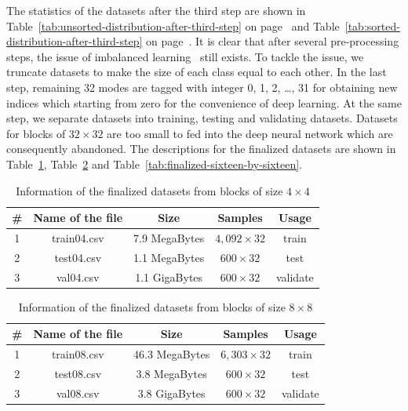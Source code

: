 The statistics of the datasets after the third step are
shown in Table~\ref{tab:unsorted-distribution-after-third-step}
on page~\pageref{tab:unsorted-distribution-after-third-step} and 
Table~\ref{tab:sorted-distribution-after-third-step}
on page~\pageref{tab:sorted-distribution-after-third-step}.
It is clear that after several pre-processing steps,
the issue of imbalanced learning~\parencite{RN215}
still exists.
To tackle the issue, we truncate datasets to make the
size of each class equal to each other.
In the last step, remaining 32 modes are tagged with integer
0, 1, 2, \ldots, 31 for obtaining new indices which
starting from zero for the convenience of deep learning.
At the same step, we separate datasets into training, 
testing and validating datasets.
Datasets for blocks of \(32\times32\) are too small
to fed into the deep neural network which are
consequently abandoned.
The descriptions for the finalized datasets
are shown in Table~\ref{tab:finalized-four-by-four},
Table~\ref{tab:finalized-eight-by-eight}
and Table~\ref{tab:finalized-sixteen-by-sixteen}.
\begin{table}[H]
    \caption{Information of the finalized datasets from blocks of size \(4\times4\)}
    \bigskip\label{tab:finalized-four-by-four}
    \centering
    \begin{tabular}{c c c c c}
        \toprule
        \# & Name of the file & Size & Samples & Usage\\
        \midrule
        1 & train04.csv & 7.9 MegaBytes & \(4,092\times32\) & train\\
        2 & test04.csv & 1.1 MegaBytes & \(600\times32\) & test\\
        3 & val04.csv & 1.1 GigaBytes & \(600\times32\) & validate\\
        \bottomrule
    \end{tabular}
\end{table}

\begin{table}[H]
    \caption{Information of the finalized datasets from blocks of size \(8\times8\)}
    \bigskip\label{tab:finalized-eight-by-eight}
    \centering
    \begin{tabular}{c c c c c}
        \toprule
        \# & Name of the file & Size & Samples & Usage\\
        \midrule
        1 & train08.csv & 46.3 MegaBytes & \(6,303\times32\) & train\\
        2 & test08.csv & 3.8 MegaBytes & \(600\times32\) & test\\
        3 & val08.csv & 3.8 GigaBytes & \(600\times32\) & validate\\
        \bottomrule
    \end{tabular}
\end{table}

